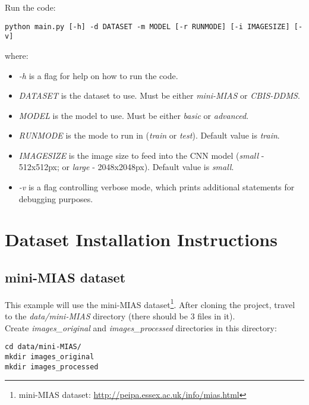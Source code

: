 Run the code:

\begin{lstlisting}
python main.py [-h] -d DATASET -m MODEL [-r RUNMODE] [-i IMAGESIZE] [-v]
\end{lstlisting}

where:
\begin{itemize}
    \item \textit{-h} is a  flag for help on how to run the code.
    \item \textit{DATASET} is the dataset to use. Must be either \textit{mini-MIAS} or \textit{CBIS-DDMS}.
    \item \textit{MODEL} is the model to use. Must be either \textit{basic} or \textit{advanced}.
    \item \textit{RUNMODE} is the mode to run in (\textit{train} or \textit{test}). Default value is \textit{train}.
    \item \textit{IMAGESIZE} is the image size to feed into the CNN model (\textit{small} - 512x512px; or \textit{large} - 2048x2048px). Default value is \textit{small}.
    \item \textit{-v} is a flag controlling verbose mode, which prints additional statements for debugging purposes.
\end{itemize}


\section{Dataset Installation Instructions}

\subsection{mini-MIAS dataset}

This example will use the mini-MIAS dataset\footnote{mini-MIAS dataset: \url{http://peipa.essex.ac.uk/info/mias.html}}. After cloning the project, travel to the \textit{data/mini-MIAS} directory (there should be 3 files in it).\\

Create \textit{images\_original} and \textit{images\_processed} directories in this directory: 

\begin{lstlisting}
cd data/mini-MIAS/
mkdir images_original
mkdir images_processed
\end{lstlisting}

